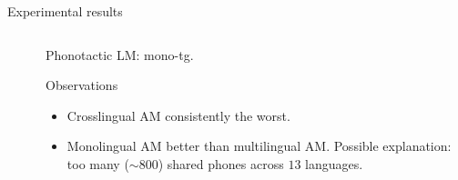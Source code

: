 \documentclass{beamer}
\begin{document}
\begin{frame}{Experimental results}
\begin{columns}
\begin{table}
{\begin{tabular}{l|ccc}
\bottomrule
\end{tabular}%
}
\label{tab:PER_results_am}
\end{table}
    \begin{footnotesize}
        \begin{block}{}
           Phonotactic LM: mono-tg.
        \end{block} 
        \begin{block}{Observations}
        \begin{itemize}
            \item Crosslingual AM consistently the worst.
            \item Monolingual AM better than multilingual AM. Possible explanation: too many  ($\sim 800$) shared phones across $13$ languages.
        \end{itemize}
    
    \end{block}
    \end{footnotesize}

\end{columns}
    
\end{frame}
\end{document}
